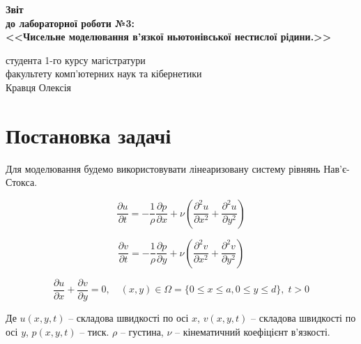 \documentclass[a4paper,12pt]{article}
\begin{document}
	
	\begin{titlepage}
		\vspace*{6cm}
		\begin{center}
			
			\large
			\textbf{Звіт}\\
			\textbf{до лабораторної роботи №3:}\\
			\textbf{<<Чисельне моделювання в’язкої ньютонівської нестислої рідини.>>}
			
		\end{center}
		
		\vspace{8cm}
		\begin{flushright}
			студента 1-го курсу магістратури\\
			факультету комп'ютерних наук та кібернетики\\
			Кравця Олексія
		\end{flushright}
		
	\end{titlepage}

\newpage
\tableofcontents
\newpage
\section{Постановка задачі}

Для моделювання будемо використовувати лінеаризовану систему рівнянь Нав'є-Стокса.

\begin{equation} \label{eq1.1}
	\frac{\partial u}{\partial t} = - \frac{1}{\rho} \frac{\partial p}{\partial x} + \nu \left( \frac{\partial^2 u}{\partial x^2} + \frac{\partial^2 u}{\partial y^2} \right)
\end{equation}

\begin{equation} \label{eq1.2}
\frac{\partial v}{\partial t} = - \frac{1}{\rho} \frac{\partial p}{\partial y} + \nu \left( \frac{\partial^2 v}{\partial x^2} + \frac{\partial^2 v}{\partial y^2} \right)
\end{equation}

\begin{equation} \label{eq1.3}
	\frac{\partial u}{\partial x}+ \frac{\partial v}{\partial y} = 0, \quad (x,y) \in \Omega = \{ 0\le x \le a, 0 \le y \le d \}, \; t > 0
\end{equation}

Де $u(x,y,t)$ -- складова швидкості по осі $x$, $v(x,y,t)$ -- складова швидкості по осі $y$, $p(x,y,t)$ -- тиск. $\rho$ -- густина, $\nu$ -- кінематичний коефіцієнт в'язкості.
\end{document}
